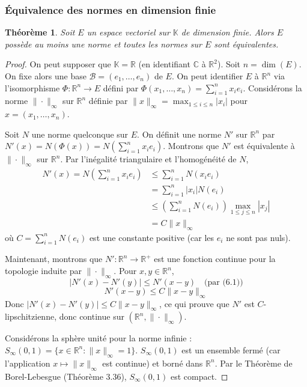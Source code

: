 \documentclass{article}
\newtheorem{theorem}{Théorème}
\newcommand{\K}{\mathbb{K}}
\newcommand{\R}{\mathbb{R}}
\newcommand{\C}{\mathbb{C}}
\begin{document}
\subsubsection{Équivalence des normes en dimension finie}

\begin{theorem} \label{thm:equiv_dim_finie}
Soit $E$ un espace vectoriel sur $\K$ de dimension finie. Alors $E$ possède au moins une norme et toutes les normes sur $E$ sont équivalentes.
\end{theorem}

\begin{proof}
On peut supposer que $\K = \R$ (en identifiant $\C$ à $\R^2$).
Soit $n = \dim(E)$. On fixe alors une base $\mathcal{B} = (e_1, \dots, e_n)$ de $E$. On peut identifier $E$ à $\R^n$ via l'isomorphisme $\Phi: \R^n \to E$ défini par $\Phi(x_1, \dots, x_n) = \sum_{i=1}^n x_i e_i$.
Considérons la norme $\|\cdot\|_\infty$ sur $\R^n$ définie par $\|x\|_\infty = \max_{1 \leq i \leq n} |x_i|$ pour $x = (x_1, \dots, x_n)$.

Soit $N$ une norme quelconque sur $E$. On définit une norme $N'$ sur $\R^n$ par $N'(x) = N(\Phi(x)) = N(\sum_{i=1}^n x_i e_i)$.
Montrons que $N'$ est équivalente à $\|\cdot\|_\infty$ sur $\R^n$.
Par l'inégalité triangulaire et l'homogénéité de $N$,
\begin{align*}
N'(x) = N\left(\sum_{i=1}^n x_i e_i\right) &\leq \sum_{i=1}^n N(x_i e_i) \\
&= \sum_{i=1}^n |x_i| N(e_i) \\
&\leq \left(\sum_{i=1}^n N(e_i)\right) \max_{1 \leq j \leq n} |x_j| \\
&= C \|x\|_\infty
\end{align*}
où $C = \sum_{i=1}^n N(e_i)$ est une constante positive (car les $e_i$ ne sont pas nuls).

Maintenant, montrons que $N': \R^n \to \R^+$ est une fonction continue pour la topologie induite par $\|\cdot\|_\infty$. Pour $x, y \in \R^n$,
\[ |N'(x) - N'(y)| \leq N'(x - y) \quad \text{(par (6.1))} \]
\[ N'(x - y) \leq C \|x - y\|_\infty \]
Donc $|N'(x) - N'(y)| \leq C \|x - y\|_\infty$, ce qui prouve que $N'$ est $C$-lipschitzienne, donc continue sur $(\R^n, \|\cdot\|_\infty)$.

Considérons la sphère unité pour la norme infinie : $S_\infty(0, 1) = \{x \in \R^n : \|x\|_\infty = 1\}$.
$S_\infty(0, 1)$ est un ensemble fermé (car l'application $x \mapsto \|x\|_\infty$ est continue) et borné dans $\R^n$. Par le Théorème de Borel-Lebesgue (Théorème 3.36), $S_\infty(0, 1)$ est compact.


\end{proof}
\end{document}
